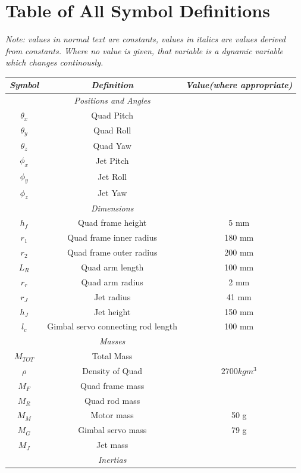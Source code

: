 \documentclass[10pt]{article}
\begin{document}
\section{Table of All Symbol Definitions}
\begin{center}
    \emph{Note: values in normal text are constants, values in italics are values derived from constants. Where no value is given, that variable is a dynamic variable which changes continously.}
\begin{longtable}{|ccc|}
    \hline
    \emph{Symbol} & \emph{Definition} & \emph{Value(where appropriate)} \\
    \hline \endhead
    & \emph{Positions and Angles} & \\
    \hline
    $\theta_x$ & Quad Pitch & \\
    $\theta_y$ & Quad Roll & \\
    $\theta_z$ & Quad Yaw & \\
    $\phi_x$ & Jet Pitch & \\
    $\phi_y$ & Jet Roll & \\
    $\phi_z$ & Jet Yaw & \\
    \hline
    & \emph{Dimensions} & \\
    \hline
    $h_f$ & Quad frame height & 5 mm \\
    $r_1$ & Quad frame inner radius & 180 mm \\
    $r_2$ & Quad frame outer radius & 200 mm \\
    $L_R$ & Quad arm length & 100 mm \\
    $r_r$ & Quad arm radius & 2 mm \\
    $r_J$ & Jet radius & 41 mm \\
    $h_J$ & Jet height & 150 mm \\
    $l_c$ & Gimbal servo connecting rod length & 100 mm \\
    \hline
    & \emph{Masses} & \\
    \hline
    $M_{TOT}$ & Total Mass & \\
    $\rho$ & Density of Quad & $2700 kgm^3$ \\
    $M_F$ & Quad frame mass & \\
    $M_R$ & Quad rod mass & \\
    $M_M$ & Motor mass & 50 g \\
    $M_G$ & Gimbal servo mass & 79 g \\
    $M_J$ & Jet mass & \\
    \hline
    & \emph{Inertias} & \\

\end{longtable}
\end{center}
\end{document}
